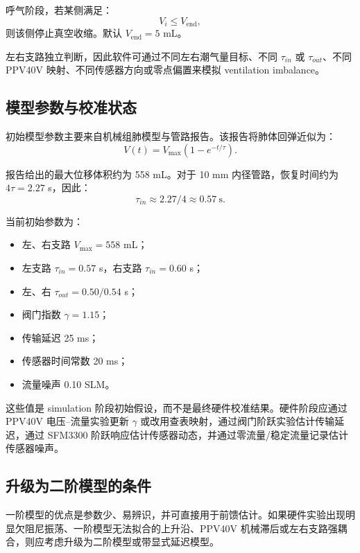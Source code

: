 \documentclass[UTF8,11pt,a4paper]{ctexart}
\begin{document}
呼气阶段，若某侧满足：
\begin{equation}
  V_i \leq V_{\mathrm{end}},
\end{equation}
则该侧停止真空收缩。默认 $V_{\mathrm{end}}=5$ mL。

左右支路独立判断，因此软件可通过不同左右潮气量目标、不同 $\tau_{in}$ 或 $\tau_{out}$、不同 PPV40V 映射、不同传感器方向或零点偏置来模拟 ventilation imbalance。

\subsection{模型参数与校准状态}

初始模型参数主要来自机械组肺模型与管路报告。该报告将肺体回弹近似为：
\begin{equation}
  V(t)=V_{\max}(1-e^{-t/\tau}).
\end{equation}

报告给出的最大位移体积约为 558 mL。对于 10 mm 内径管路，恢复时间约为 $4\tau=2.27$ s，因此：
\begin{equation}
  \tau_{in}\approx 2.27/4 \approx 0.57~\mathrm{s}.
\end{equation}

当前初始参数为：
\begin{itemize}
  \item 左、右支路 $V_{\max}=558$ mL；
  \item 左支路 $\tau_{in}=0.57$ s，右支路 $\tau_{in}=0.60$ s；
  \item 左、右 $\tau_{out}=0.50/0.54$ s；
  \item 阀门指数 $\gamma=1.15$；
  \item 传输延迟 25 ms；
  \item 传感器时间常数 20 ms；
  \item 流量噪声 0.10 SLM。
\end{itemize}

这些值是 simulation 阶段初始假设，而不是最终硬件校准结果。硬件阶段应通过 PPV40V 电压--流量实验更新 $\gamma$ 或改用查表映射，通过阀门阶跃实验估计传输延迟，通过 SFM3300 阶跃响应估计传感器动态，并通过零流量/稳定流量记录估计传感器噪声。

\subsection{升级为二阶模型的条件}

一阶模型的优点是参数少、易辨识，并可直接用于前馈估计。如果硬件实验出现明显欠阻尼振荡、一阶模型无法拟合的上升沿、PPV40V 机械滞后或左右支路强耦合，则应考虑升级为二阶模型或带显式延迟模型。
\end{document}

